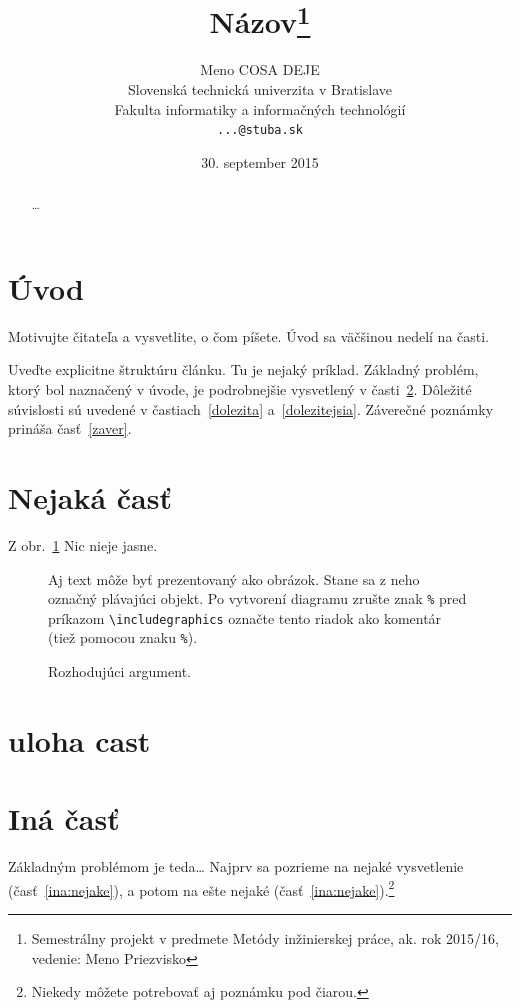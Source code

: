 \documentclass[10pt,twoside,slovak,a4paper]{coursepaper}
\title{Názov\thanks{Semestrálny projekt v predmete Metódy inžinierskej práce, ak. rok 2015/16, vedenie: Meno Priezvisko}} %
\author{Meno COSA DEJE\\[2pt]
	{\small Slovenská technická univerzita v Bratislave}\\
	{\small Fakulta informatiky a informačných technológií}\\
	{\small \texttt{...@stuba.sk}}
	}
\date{\small 30. september 2015} %
\begin{document}
\maketitle

\begin{abstract}
\ldots
\end{abstract}



\section{Úvod}

Motivujte čitateľa a vysvetlite, o čom píšete. Úvod sa väčšinou nedelí na časti.

Uveďte explicitne štruktúru článku. Tu je nejaký príklad.
Základný problém, ktorý bol naznačený v úvode, je podrobnejšie vysvetlený v časti~\ref{nejaka}.
Dôležité súvislosti sú uvedené v častiach~\ref{dolezita} a~\ref{dolezitejsia}.
Záverečné poznámky prináša časť~\ref{zaver}.



\section{Nejaká časť} \label{nejaka}

Z obr.~\ref{f:rozhod} Nic nieje jasne. 

\begin{figure}[tbh]
\centering
Aj text môže byť prezentovaný ako obrázok. Stane sa z neho označný plávajúci objekt. Po vytvorení diagramu zrušte znak \texttt{\%} pred príkazom \verb|\includegraphics| označte tento riadok ako komentár (tiež pomocou znaku \texttt{\%}).
\caption{Rozhodujúci argument.}
\label{f:rozhod}
\end{figure}


\section{uloha cast} \label{uloha}



\section{Iná časť} \label{ina}

Základným problémom je teda\ldots{} Najprv sa pozrieme na nejaké vysvetlenie (časť~\ref{ina:nejake}), a potom na ešte nejaké (časť~\ref{ina:nejake}).\footnote{Niekedy môžete potrebovať aj poznámku pod čiarou.}
\end{document}
